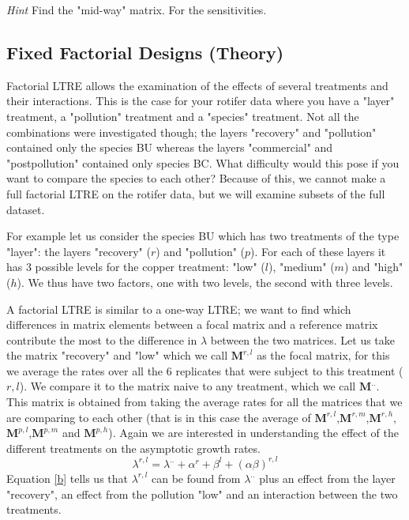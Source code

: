 \documentclass{article}\usepackage[]{graphicx}\usepackage[]{color}
\begin{document}
\textit{Hint} Find the "mid-way" matrix. For the sensitivities.

\subsection{Fixed Factorial Designs (Theory)}
Factorial LTRE allows the examination of the effects of several treatments and their interactions. This is the case for your rotifer data where you have a "layer" treatment, a "pollution" treatment and a "species" treatment. Not all the combinations were investigated though; the layers "recovery" and "pollution" contained only the species BU whereas the layers "commercial" and "postpollution" contained only species BC. What difficulty would this pose if you want to compare the species to each other? Because of this, we cannot make a full factorial LTRE on the rotifer data, but we will examine subsets of the full dataset.


For example let us consider the species BU which has two treatments of the type "layer": the layers "recovery" ($r$) and "pollution" ($p$). For each of these layers it has 3 possible levels for the copper treatment: "low" ($l$), "medium" ($m$) and "high" ($h$). We thus have two factors, one with two levels, the second with three levels.

A factorial LTRE is similar to a one-way LTRE; we want to find which differences in matrix elements between a focal matrix and a reference matrix contribute the most to the difference in $\lambda$ between the two matrices. Let us take the matrix "recovery" and "low" which we call $\boldsymbol{M}^{r,l}$ as the focal matrix, for this we average the rates over all the $6$ replicates that were subject to this treatment ($r,l$). We compare it to the matrix naive to any treatment, which we call $\boldsymbol{M}^{..}$. This matrix is obtained from taking the average rates for all the matrices that we are comparing to each other (that is in this case the average of $\boldsymbol{M}^{r,l}$,$\boldsymbol{M}^{r,m}$,$\boldsymbol{M}^{r,h}$,$\boldsymbol{M}^{p,l}$,$\boldsymbol{M}^{p,m}$ and $\boldsymbol{M}^{p,h}$). Again we are interested in understanding the effect of the different treatments on the asymptotic growth rates.
\begin{equation}\label{b}
\lambda^{r,l}=\lambda^{..}+\alpha^{r}+\beta^{l}+(\alpha \beta)^{r,l}
\end{equation}
Equation \ref{b} tells us that $\lambda^{r,l}$ can be found from $\lambda^{..}$ plus an effect from the layer "recovery", an effect from the pollution "low" and an interaction between the two treatments.
\end{document}

